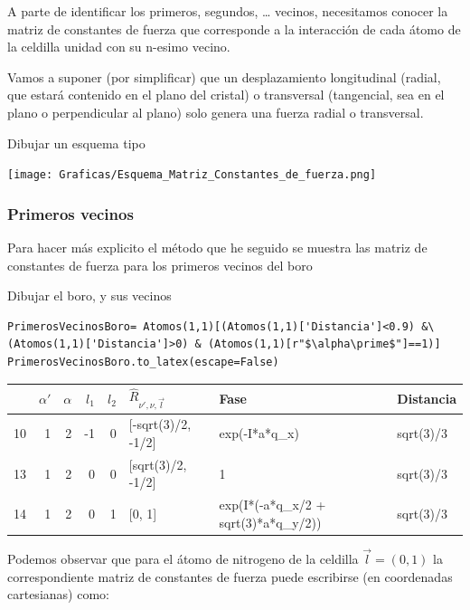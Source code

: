 \documentclass[12pt,a4paper]{article}
\begin{document}
A parte de identificar los primeros, segundos, \ldots{} vecinos, necesitamos conocer la matriz de constantes de fuerza que corresponde a la interacción de cada átomo de la celdilla unidad con su n-esimo vecino.

Vamos a suponer (por simplificar) que un desplazamiento longitudinal (radial, que estará contenido en el plano del cristal) o transversal (tangencial, sea en el plano o perpendicular al plano) solo genera una fuerza radial o transversal.

\color{red}
Dibujar un esquema tipo
\begin{center}
\texttt{[image: Graficas/Esquema\_Matriz\_Constantes\_de\_fuerza.png]}
\end{center}
\normalcolor
\subsubsection{Primeros vecinos}
\label{sec:org5dcb10a}
Para hacer más explicito el método que he seguido se muestra las matriz de constantes de fuerza para los primeros vecinos del boro 

\color{red} 
Dibujar el boro, y sus vecinos 
\normalcolor

\begin{verbatim}
PrimerosVecinosBoro= Atomos(1,1)[(Atomos(1,1)['Distancia']<0.9) &\
(Atomos(1,1)['Distancia']>0) & (Atomos(1,1)[r"$\alpha\prime$"]==1)]
PrimerosVecinosBoro.to_latex(escape=False)
\end{verbatim}

\begin{tabular}{lrrrrlll}
\toprule
{} &  $\alpha\prime$ &  $\alpha$ &  $l_1$ &  $l_2$ & $\hat R_{\nu\prime,\nu,\vec l}$ &                                 Fase &  Distancia \\
\midrule
10 &               1 &         2 &     -1 &      0 &              [-sqrt(3)/2, -1/2] &                        exp(-I*a*q_x) &  sqrt(3)/3 \\
13 &               1 &         2 &      0 &      0 &               [sqrt(3)/2, -1/2] &                                    1 &  sqrt(3)/3 \\
14 &               1 &         2 &      0 &      1 &                          [0, 1] &  exp(I*(-a*q_x/2 + sqrt(3)*a*q_y/2)) &  sqrt(3)/3 \\
\bottomrule
\end{tabular}

Podemos observar que para el átomo de nitrogeno de la celdilla \(\vec l = (0,1)\) la correspondiente matriz de constantes de fuerza puede escribirse (en coordenadas cartesianas) como:
\end{document}
